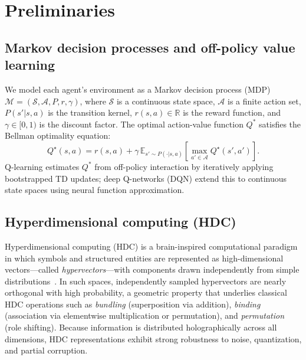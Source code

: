 \section{Preliminaries}
\label{sec:preliminaries}

\subsection{Markov decision processes and off-policy value learning}

We model each agent's environment as a Markov decision process (MDP) $\mathcal{M} = (\mathcal{S}, \mathcal{A}, P, r, \gamma)$, where $\mathcal{S}$ is a continuous state space, $\mathcal{A}$ is a finite action set, $P(s'|s,a)$ is the transition kernel, $r(s,a) \in \mathbb{R}$ is the reward function, and $\gamma \in [0,1)$ is the discount factor. The optimal action-value function $Q^*$ satisfies the Bellman optimality equation:
\begin{equation}
Q^\star(s,a)= r(s,a) + \gamma\,\mathbb{E}_{s'\sim P(\cdot|s,a)}
\left[\max_{a'\in\mathcal{A}} Q^\star(s',a')\right].
\label{eq:bellman}
\end{equation}
Q-learning \citep{watkins1992q} estimates $Q^*$ from off-policy interaction by iteratively applying bootstrapped TD updates; deep Q-networks (DQN) \citep{mnih2015human} extend this to continuous state spaces using neural function approximation.

\subsection{Hyperdimensional computing (HDC)}

\label{subsec:hdc_background}
Hyperdimensional computing (HDC) is a brain-inspired computational paradigm in which symbols and structured entities are represented as high-dimensional vectors---called \emph{hypervectors}---with components drawn independently from simple distributions~\cite{kanerva2009hyperdimensional}. In such spaces, independently sampled hypervectors are nearly orthogonal with high probability, a geometric property that underlies classical HDC operations such as \emph{bundling} (superposition via addition), \emph{binding} (association via elementwise multiplication or permutation), and \emph{permutation} (role shifting). Because information is distributed holographically across all dimensions, HDC representations exhibit strong robustness to noise, quantization, and partial corruption.

